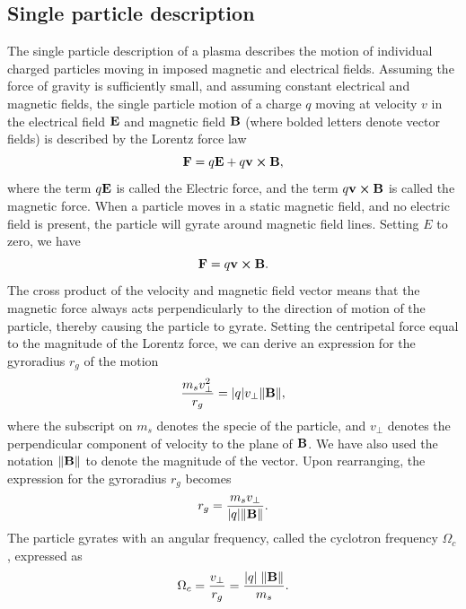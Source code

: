 \subsection{Single particle description}
\label{subsec:basicEq}
The single particle description of a plasma describes the motion of individual charged particles moving in imposed magnetic and electrical fields. Assuming the force of gravity is sufficiently small, and assuming constant electrical and magnetic fields, the single particle motion of a charge $q$ moving at velocity $v$ in the electrical field $\vb{E}$ and magnetic field $\vb{B}$ (where bolded letters denote vector fields) is described by the Lorentz force law 
\begin{equation}\label{eq:lorentz}
    \vb{F} = q \vb{E} + q \vb{v} \cp \vb{B},
\end{equation}
where the term $q \vb{E}$ is called the Electric force, and the term $q\vb{v} \cp \vb{B}$ is called the magnetic force. When a particle moves in a static magnetic field, and no electric field is present, the particle will gyrate around magnetic field lines. Setting $E$ to zero, we have
\begin{equation}\label{eq:magF}
    \vb{F} = q \vb{v} \cp \vb{B}.
\end{equation}
The cross product of the velocity and magnetic field vector means that the magnetic force always acts perpendicularly to the direction of motion of the particle, thereby causing the particle to gyrate. Setting the centripetal force equal to the magnitude of the Lorentz force, we can derive an expression for the gyroradius $r_g$ of the motion
\begin{equation}\label{eq:gyrorad}
    \frac{m_s v_{\perp}^2}{r_g} = \abs{q} v_{\perp} \norm{\vb{B}},
\end{equation}
where the subscript on $m_s$ denotes the specie of the particle, and $v_\perp$ denotes the perpendicular component of velocity to the plane of $\vb{B}$. We have also used the notation $\norm{\vb{B}}$ to denote the magnitude of the vector. Upon rearranging, the expression for the gyroradius $r_g$ becomes
\begin{equation}
    r_g = \frac{m_s v_\perp}{\abs{q} \norm{\vb{B}}}.
\end{equation}
The particle gyrates with an angular frequency, called the cyclotron frequency $\Omega_c$, expressed as 
\begin{equation}
    \Omega_c = \frac{v_\perp}{r_g} = \frac{\abs{q} \; \norm{\vb{B}}}{m_s}.
\end{equation}

